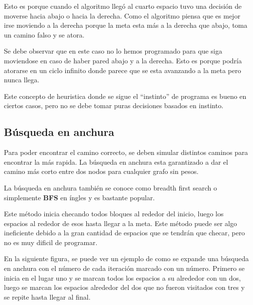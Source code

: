 \documentclass{article}
\begin{document}
Esto es porque cuando el algoritmo llegó al cuarto espacio tuvo una decisión de moverse hacia abajo o hacia la derecha. Como el algoritmo piensa que es mejor irse moviendo a la derecha porque la meta esta más a la derecha que abajo, toma un camino falso y se atora.

Se debe observar que en este caso no lo hemos programado para que siga moviendose en caso de haber pared abajo y a la derecha. Esto es porque podría atorarse en un ciclo infinito donde parece que se esta avanzando a la meta pero nunca llega.

Este concepto de heuristica donde se sigue el ``instinto'' de programa es bueno en ciertos casos, pero no se debe tomar puras decisiones basados en instinto.

\subsection{Búsqueda en anchura}

Para poder encontrar el camino correcto, se deben simular distintos caminos para encontrar la más rapida. La búsqueda en anchura esta garantizado a dar el camino más corto entre dos nodos para cualquier grafo sin pesos.

La búsqueda en anchura también se conoce como breadth first search o simplemente \textbf{BFS} en íngles y es bastante popular.

Este método inicia checando todos bloques al rededor del inicio, luego los espacios al rededor de esos hasta llegar a la meta. Este método puede ser algo ineficiente debido a la gran cantidad de espacios que se tendrán que checar, pero no es muy dificil de programar.

En la siguiente figura, se puede ver un ejemplo de como se expande una búsqueda en anchura con el número de cada iteración marcado con un número. Primero se inicia en el lugar uno y se marcan todos los espacios a su alrededor con un dos, luego se marcan los espacios alrededor del dos que no fueron visitados con tres y se repite hasta llegar al final.
\end{document}
